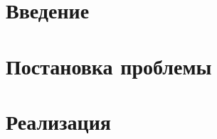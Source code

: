 \documentclass[a4paper, 14pt]{extreport}
\begin{document}




\chapter{Введение}







\chapter{Постановка проблемы}




\chapter{Реализация}





\printbibliography
\end{document}
